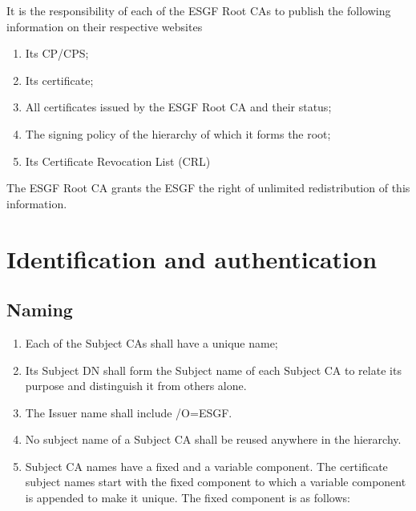 It is the responsibility of each of the ESGF Root CAs to publish the
following information on their respective websites

\begin{enumerate}
\item
  
  Its CP/CPS;
  
\item
  
  Its certificate;
  
\item
  
  All certificates issued by the ESGF Root CA and their status;
  
\item
  
  The signing policy of the hierarchy of which it forms the root;
  
\item
  
  Its Certificate Revocation List (CRL)
  
\end{enumerate}

The ESGF Root CA grants the ESGF the right of unlimited
redistribution of this information.

\section{Identification and authentication}\label{identification-and-authentication}

\subsection{Naming}\label{naming}

\begin{enumerate}
\item
  
  Each of the Subject CAs shall have a unique name;
  
\item
  
  Its Subject DN shall form the Subject name of each Subject CA to
  relate its purpose and distinguish it from others alone.
  
\item
  
  The Issuer name shall include /O=ESGF.
  
\item
  
  No subject name of a Subject CA shall be reused anywhere in the
  hierarchy.
  
\item
  
  Subject CA names have a fixed and a variable component. The
  certificate subject names start with the fixed component to which a
  variable component is appended to make it unique. The fixed component
  is as follows:
  
\end{enumerate}

